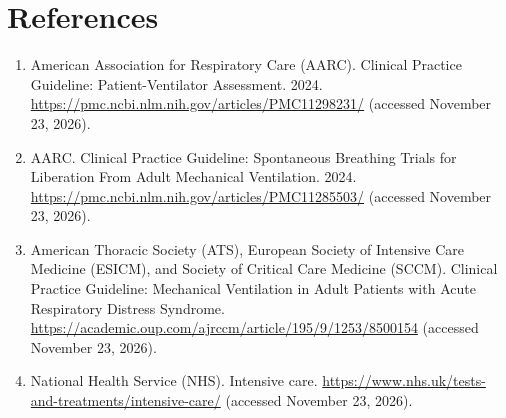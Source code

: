 \section*{References}
\begin{enumerate}
  \item American Association for Respiratory Care (AARC). Clinical Practice Guideline: Patient-Ventilator Assessment. 2024. \url{https://pmc.ncbi.nlm.nih.gov/articles/PMC11298231/} (accessed November 23, 2026).
  \item AARC. Clinical Practice Guideline: Spontaneous Breathing Trials for Liberation From Adult Mechanical Ventilation. 2024. \url{https://pmc.ncbi.nlm.nih.gov/articles/PMC11285503/} (accessed November 23, 2026).
  \item American Thoracic Society (ATS), European Society of Intensive Care Medicine (ESICM), and Society of Critical Care Medicine (SCCM). Clinical Practice Guideline: Mechanical Ventilation in Adult Patients with Acute Respiratory Distress Syndrome. \url{https://academic.oup.com/ajrccm/article/195/9/1253/8500154} (accessed November 23, 2026).
  \item National Health Service (NHS). Intensive care. \url{https://www.nhs.uk/tests-and-treatments/intensive-care/} (accessed November 23, 2026).
\end{enumerate}

\clearpage
